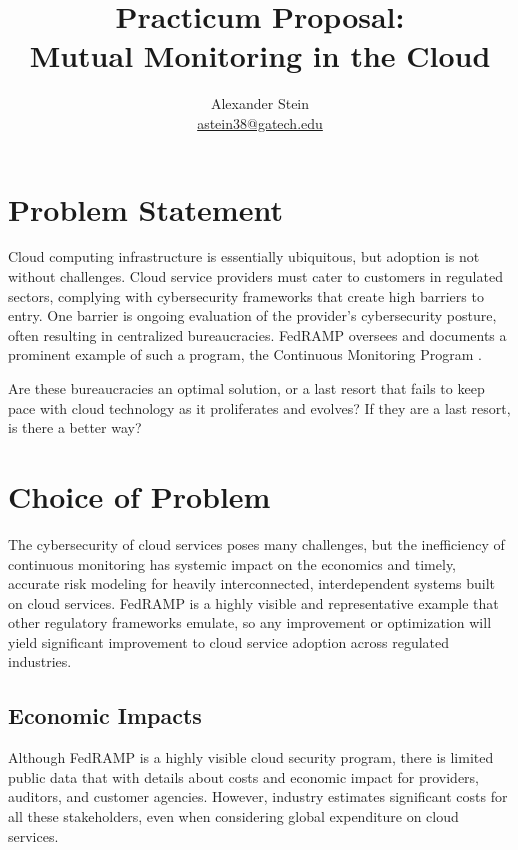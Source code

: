 \documentclass{jdf}
\begin{document}
\title{Practicum Proposal: \\ Mutual Monitoring in the Cloud}
\author{Alexander Stein \\ \href{mailto:astein38@gatech.edu}{astein38@gatech.edu}}

\maketitle
\thispagestyle{fancy}

\section{Problem Statement}

Cloud computing infrastructure is essentially ubiquitous, but adoption is not without challenges. Cloud service providers must cater to customers in regulated sectors, complying with cybersecurity frameworks that create high barriers to entry. One barrier is ongoing evaluation of the provider's cybersecurity posture, often resulting in centralized bureaucracies. FedRAMP oversees and documents a prominent example of such a program, the Continuous Monitoring Program \citeyear[p.~14]{fedramp_auth_playbook25}.

Are these bureaucracies an optimal solution, or a last resort that fails to keep pace with cloud technology as it proliferates and evolves? If they are a last resort, is there a better way?

\section{Choice of Problem}

The cybersecurity of cloud services poses many challenges, but the inefficiency of continuous monitoring has systemic impact on the economics and timely, accurate risk modeling for heavily interconnected, interdependent systems built on cloud services. FedRAMP is a highly visible and representative example that other regulatory frameworks emulate, so any improvement or optimization will yield significant improvement to cloud service adoption across regulated industries.

\subsection{Economic Impacts}

Although FedRAMP is a highly visible cloud security program, there is limited public data that with details about costs and economic impact for providers, auditors, and customer agencies. However, industry estimates significant costs for all these stakeholders, even when considering global expenditure on cloud services.
\end{document}
